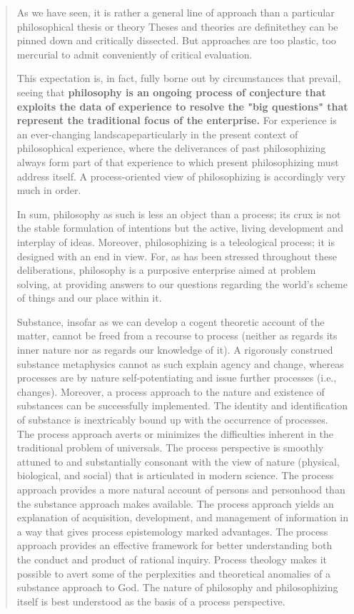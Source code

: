 \documentclass[a4paper]{Thesis}
\begin{document}
\begin{quotation}
		As
		we have seen, it is rather a general line of approach than a particular philosophical thesis
		or theory
		Theses and theories are definitethey can be pinned down
		and critically dissected. But approaches are too plastic, too mercurial to admit
		conveniently of critical evaluation.
		
		This expectation is, in fact, fully borne out by circumstances that prevail,
		seeing that 
		\textbf{philosophy is an ongoing process of conjecture that exploits the data of
			experience to resolve the "big questions" that represent the traditional focus of the
			enterprise. 
		}For experience is an ever-changing landscapeparticularly in the present
		context of philosophical experience, where the deliverances of past philosophizing always
		form part of that experience to which present philosophizing must address itself. A
		process-oriented view of philosophizing is accordingly very much in order.
		
		In sum, philosophy as such is less an object
		than a process; its crux is not the stable formulation of intentions but the active, living
		development and interplay of ideas.
		Moreover, philosophizing is a teleological process; it is designed with an end in view.
		For,
		as has been stressed throughout these deliberations, philosophy is a purposive enterprise
		aimed at problem solving, at providing answers to our questions regarding the world's
		scheme of things and our place within it.
		
		Substance, insofar as we can develop a cogent theoretic account of the
		matter, cannot be freed from a recourse to process (neither as regards
		its inner nature nor as regards our knowledge of it).
		A rigorously construed substance metaphysics cannot as such explain
		agency and change, whereas processes are by nature self-potentiating
		and issue further processes (i.e., changes).
		Moreover, a process approach to the nature and existence of substances
		can be successfully implemented.
		The identity and identification of substance is inextricably bound up with
		the occurrence of processes.
		The process approach averts or minimizes the difficulties inherent in the
		traditional problem of universals.
		The process perspective is smoothly attuned to and substantially
		consonant with the view of nature (physical, biological, and social) that is
		articulated in modern science.
		The process approach provides a more natural account of persons and
		personhood than the substance approach makes available.
		The process approach yields an explanation of acquisition, development,
		and management of information in a way that gives process
		epistemology marked advantages.
		The process approach provides an effective framework for better
		understanding both the conduct and product of rational inquiry.
		Process theology makes it possible to avert some of the perplexities and
		theoretical anomalies of a substance approach to God.
		The nature of philosophy and philosophizing itself is best understood as
		the basis of a process perspective.
	\end{quotation}
	
\end{document}
